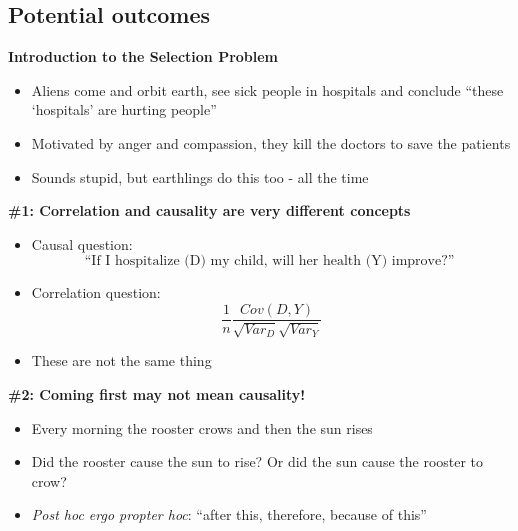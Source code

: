 \documentclass[notes=show]{beamer}
\begin{document}
	

\subsection{Potential outcomes}


\begin{frame}
	\begin{center}
	\textbf{Introduction to the Selection Problem}
	\end{center}
	
	\begin{itemize}
	\item Aliens come and orbit earth, see sick people in hospitals and conclude ``these `hospitals' are hurting people'' 
	\item Motivated by anger and compassion, they kill the doctors to save the patients
	\item Sounds stupid, but earthlings do this too - all the time
	\end{itemize}		
		
\end{frame}

\begin{frame}[plain]
\begin{center}
\textbf{\#1: Correlation and causality are very different concepts}
\end{center}

		\begin{itemize}
	\item Causal question:$$\text{``If I hospitalize (D) my child, will her health (Y) improve?'' }$$
	\item Correlation question:  $$\frac{1}{n}\frac{Cov(D,Y)}{\sqrt{Var_D}\sqrt{{Var_Y}}}$$
	\item These are not the same thing
		\end{itemize}

\end{frame}


\begin{frame}[plain]
\begin{center}
\textbf{\#2: Coming first may not mean causality!}
\end{center}

\begin{itemize}
\item Every morning the rooster crows and then the sun rises
\item Did the rooster cause the sun to rise? Or did the sun cause the rooster to crow?
\item \emph{Post hoc ergo propter hoc}: ``after this, therefore, because of this''
\end{itemize}

\end{frame}
\end{document}
